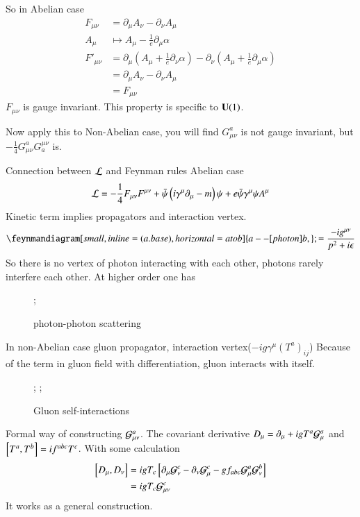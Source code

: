 So in Abelian case
\begin{align*}
   F_{\mu\nu} &= \partial_\mu A_\nu - \partial_\nu A_\mu \\
   A_\mu & \mapsto A_\mu - \frac{1}{e} \partial_\mu \alpha  \\
   F'_{\mu\nu} &= \partial_\mu \left( A_\mu + \frac{1}{e} \partial_\nu \alpha \right) - \partial_\nu \left( A_\mu + \frac{1}{e} \partial_\mu \alpha \right) \\
               &= \partial_\mu A_\nu - \partial_\nu A_\mu \\
               &= F_{\mu\nu}
\end{align*}
$F_{\mu\nu}$ is gauge invariant. This property is specific to $ \mathbf{U} (1)$.

Now apply this to Non-Abelian case, you will find $G_{\mu\nu}^a$ is not gauge invariant, but $-\frac{1}{4}G_{\mu\nu}^a G^{\mu\nu}_a$ is.

Connection between $\mathcal{L}$ and Feynman rules
Abelian case
\begin{align*}
   \mathcal{L} = -\frac{1}{4}F_{\mu\nu}F^{\mu\nu} + \bar\psi \left( i \gamma^\mu \partial_\mu - m \right) \psi + e \bar\psi \gamma^\mu \psi A^\mu
\end{align*}
Kinetic term implies propagators and interaction vertex.
\begin{align}
   \feynmandiagram[small, inline=(a.base), horizontal=a to b]{ a --[photon] b,};
   = \frac{-ig^{\mu\nu}}{p^2 + i \epsilon}
\end{align}
So there is no vertex of photon interacting with each other, photons rarely interfere each other. At higher order one has
\begin{figure}[htpb]
   \centering
   ;
   \caption{photon-photon scattering}%
   \label{fig:pps}
\end{figure}

In non-Abelian case
gluon propagator, interaction vertex($-ig\gamma^\mu (T^a)_{ij}$)
Because of the term in gluon field with differentiation, gluon interacts with itself.
\begin{figure}[htpb]
   \centering
   ;
   ;
   \caption{Gluon self-interactions}%
   \label{fig:}
\end{figure}
Formal way of constructing $\mathcal{G}_{\mu\nu}^a$. The covariant derivative $D_\mu = \partial_\mu + ig T^a \mathcal{G}^a_\mu$ and $\comm{T^a}{T^b} = if^{abc}T^c$. With some calculation 
\begin{align*}
   \comm{D_\mu}{D_\nu} &= ig T_c \left[ \partial_\mu \gf_\nu^c - \partial_\nu \gf_\mu^c - g f_{abc} \gf^a_\mu \gf^b_\nu \right] \\
                       &= ig T_c \gf_{\mu\nu}^c
\end{align*}
It works as a general construction.

